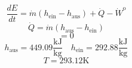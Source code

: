 

\item[a)] 
    \begin{equation}
    \frac{dE}{dt} = \dot{m} (h_{\text{ein}} - h_{\text{aus}}) + \dot{Q} - \dot{W}^{\text{o}}
    \end{equation}
    \begin{equation}
    \dot{Q} = \dot{m} (h_{\text{aus}} - h_{\text{ein}})
    \end{equation}
    \begin{equation}
    = 0
    \end{equation}
    \begin{equation}
    h_{\text{aus}} = 449.09 \frac{\text{kJ}}{\text{kg}} \quad h_{\text{ein}} = 292.88 \frac{\text{kJ}}{\text{kg}}
    \end{equation}
    \begin{equation}
    T = 293.12 \text{K}
    \end{equation}